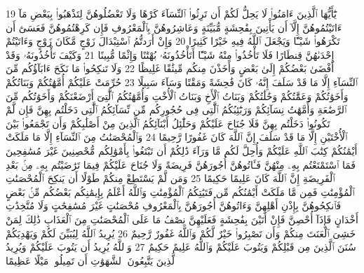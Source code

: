 {\tiny\colorbox{cl_aya}{19}} يَٰٓأَيُّهَا ٱلَّذِينَ ءَامَنُوا۟ لَا يَحِلُّ لَكُمْ أَن تَرِثُوا۟ ٱلنِّسَآءَ كَرْهًا وَلَا تَعْضُلُوهُنَّ لِتَذْهَبُوا۟ بِبَعْضِ مَآ ءَاتَيْتُمُوهُنَّ إِلَّآ أَن يَأْتِينَ بِفَٰحِشَةٍ مُّبَيِّنَةٍ وَعَاشِرُوهُنَّ بِٱلْمَعْرُوفِ فَإِن كَرِهْتُمُوهُنَّ فَعَسَىٰٓ أَن تَكْرَهُوا۟ شَيْـًٔا وَيَجْعَلَ ٱللَّهُ فِيهِ خَيْرًا كَثِيرًا
{\tiny\colorbox{cl_aya}{20}} وَإِنْ أَرَدتُّمُ ٱسْتِبْدَالَ زَوْجٍ مَّكَانَ زَوْجٍ وَءَاتَيْتُمْ إِحْدَىٰهُنَّ قِنطَارًا فَلَا تَأْخُذُوا۟ مِنْهُ شَيْـًٔا أَتَأْخُذُونَهُۥ بُهْتَٰنًا وَإِثْمًا مُّبِينًا
{\tiny\colorbox{cl_aya}{21}} وَكَيْفَ تَأْخُذُونَهُۥ وَقَدْ أَفْضَىٰ بَعْضُكُمْ إِلَىٰ بَعْضٍ وَأَخَذْنَ مِنكُم مِّيثَٰقًا غَلِيظًا
{\tiny\colorbox{cl_aya}{22}} وَلَا تَنكِحُوا۟ مَا نَكَحَ ءَابَآؤُكُم مِّنَ ٱلنِّسَآءِ إِلَّا مَا قَدْ سَلَفَ إِنَّهُۥ كَانَ فَٰحِشَةً وَمَقْتًا وَسَآءَ سَبِيلًا
{\tiny\colorbox{cl_aya}{23}} حُرِّمَتْ عَلَيْكُمْ أُمَّهَٰتُكُمْ وَبَنَاتُكُمْ وَأَخَوَٰتُكُمْ وَعَمَّٰتُكُمْ وَخَٰلَٰتُكُمْ وَبَنَاتُ ٱلْأَخِ وَبَنَاتُ ٱلْأُخْتِ وَأُمَّهَٰتُكُمُ ٱلَّٰتِىٓ أَرْضَعْنَكُمْ وَأَخَوَٰتُكُم مِّنَ ٱلرَّضَٰعَةِ وَأُمَّهَٰتُ نِسَآئِكُمْ وَرَبَٰٓئِبُكُمُ ٱلَّٰتِى فِى حُجُورِكُم مِّن نِّسَآئِكُمُ ٱلَّٰتِى دَخَلْتُم بِهِنَّ فَإِن لَّمْ تَكُونُوا۟ دَخَلْتُم بِهِنَّ فَلَا جُنَاحَ عَلَيْكُمْ وَحَلَٰٓئِلُ أَبْنَآئِكُمُ ٱلَّذِينَ مِنْ أَصْلَٰبِكُمْ وَأَن تَجْمَعُوا۟ بَيْنَ ٱلْأُخْتَيْنِ إِلَّا مَا قَدْ سَلَفَ إِنَّ ٱللَّهَ كَانَ غَفُورًا رَّحِيمًا
{\tiny\colorbox{cl_aya}{24}} وَٱلْمُحْصَنَٰتُ مِنَ ٱلنِّسَآءِ إِلَّا مَا مَلَكَتْ أَيْمَٰنُكُمْ كِتَٰبَ ٱللَّهِ عَلَيْكُمْ وَأُحِلَّ لَكُم مَّا وَرَآءَ ذَٰلِكُمْ أَن تَبْتَغُوا۟ بِأَمْوَٰلِكُم مُّحْصِنِينَ غَيْرَ مُسَٰفِحِينَ فَمَا ٱسْتَمْتَعْتُم بِهِۦ مِنْهُنَّ فَـَٔاتُوهُنَّ أُجُورَهُنَّ فَرِيضَةً وَلَا جُنَاحَ عَلَيْكُمْ فِيمَا تَرَٰضَيْتُم بِهِۦ مِنۢ بَعْدِ ٱلْفَرِيضَةِ إِنَّ ٱللَّهَ كَانَ عَلِيمًا حَكِيمًا
{\tiny\colorbox{cl_aya}{25}} وَمَن لَّمْ يَسْتَطِعْ مِنكُمْ طَوْلًا أَن يَنكِحَ ٱلْمُحْصَنَٰتِ ٱلْمُؤْمِنَٰتِ فَمِن مَّا مَلَكَتْ أَيْمَٰنُكُم مِّن فَتَيَٰتِكُمُ ٱلْمُؤْمِنَٰتِ وَٱللَّهُ أَعْلَمُ بِإِيمَٰنِكُم بَعْضُكُم مِّنۢ بَعْضٍ فَٱنكِحُوهُنَّ بِإِذْنِ أَهْلِهِنَّ وَءَاتُوهُنَّ أُجُورَهُنَّ بِٱلْمَعْرُوفِ مُحْصَنَٰتٍ غَيْرَ مُسَٰفِحَٰتٍ وَلَا مُتَّخِذَٰتِ أَخْدَانٍ فَإِذَآ أُحْصِنَّ فَإِنْ أَتَيْنَ بِفَٰحِشَةٍ فَعَلَيْهِنَّ نِصْفُ مَا عَلَى ٱلْمُحْصَنَٰتِ مِنَ ٱلْعَذَابِ ذَٰلِكَ لِمَنْ خَشِىَ ٱلْعَنَتَ مِنكُمْ وَأَن تَصْبِرُوا۟ خَيْرٌ لَّكُمْ وَٱللَّهُ غَفُورٌ رَّحِيمٌ
{\tiny\colorbox{cl_aya}{26}} يُرِيدُ ٱللَّهُ لِيُبَيِّنَ لَكُمْ وَيَهْدِيَكُمْ سُنَنَ ٱلَّذِينَ مِن قَبْلِكُمْ وَيَتُوبَ عَلَيْكُمْ وَٱللَّهُ عَلِيمٌ حَكِيمٌ
{\tiny\colorbox{cl_aya}{27}} وَٱللَّهُ يُرِيدُ أَن يَتُوبَ عَلَيْكُمْ وَيُرِيدُ ٱلَّذِينَ يَتَّبِعُونَ ٱلشَّهَوَٰتِ أَن تَمِيلُوا۟ مَيْلًا عَظِيمًا
